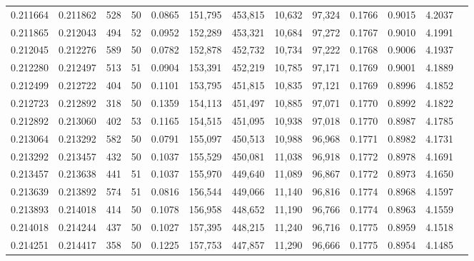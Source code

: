 \begin{tabular}{rrrrrrrrrrrrr}
0.211664 & 0.211862 &   528 &  50 &                                     0.0865 & 151,795 & 453,815 &  10,632 &  97,324 & 0.1766 & 0.9015 & 4.2037 \\
0.211865 & 0.212043 &   494 &  52 &                                     0.0952 & 152,289 & 453,321 &  10,684 &  97,272 & 0.1767 & 0.9010 & 4.1991 \\
0.212045 & 0.212276 &   589 &  50 &                                     0.0782 & 152,878 & 452,732 &  10,734 &  97,222 & 0.1768 & 0.9006 & 4.1937 \\
0.212280 & 0.212497 &   513 &  51 &                                     0.0904 & 153,391 & 452,219 &  10,785 &  97,171 & 0.1769 & 0.9001 & 4.1889 \\
0.212499 & 0.212722 &   404 &  50 &                                     0.1101 & 153,795 & 451,815 &  10,835 &  97,121 & 0.1769 & 0.8996 & 4.1852 \\
0.212723 & 0.212892 &   318 &  50 &                                     0.1359 & 154,113 & 451,497 &  10,885 &  97,071 & 0.1770 & 0.8992 & 4.1822 \\
0.212892 & 0.213060 &   402 &  53 &                                     0.1165 & 154,515 & 451,095 &  10,938 &  97,018 & 0.1770 & 0.8987 & 4.1785 \\
0.213064 & 0.213292 &   582 &  50 &                                     0.0791 & 155,097 & 450,513 &  10,988 &  96,968 & 0.1771 & 0.8982 & 4.1731 \\
0.213292 & 0.213457 &   432 &  50 &                                     0.1037 & 155,529 & 450,081 &  11,038 &  96,918 & 0.1772 & 0.8978 & 4.1691 \\
0.213457 & 0.213638 &   441 &  51 &                                     0.1037 & 155,970 & 449,640 &  11,089 &  96,867 & 0.1772 & 0.8973 & 4.1650 \\
0.213639 & 0.213892 &   574 &  51 &                                     0.0816 & 156,544 & 449,066 &  11,140 &  96,816 & 0.1774 & 0.8968 & 4.1597 \\
0.213893 & 0.214018 &   414 &  50 &                                     0.1078 & 156,958 & 448,652 &  11,190 &  96,766 & 0.1774 & 0.8963 & 4.1559 \\
0.214018 & 0.214244 &   437 &  50 &                                     0.1027 & 157,395 & 448,215 &  11,240 &  96,716 & 0.1775 & 0.8959 & 4.1518 \\
0.214251 & 0.214417 &   358 &  50 &                                     0.1225 & 157,753 & 447,857 &  11,290 &  96,666 & 0.1775 & 0.8954 & 4.1485 \\

\end{tabular}
